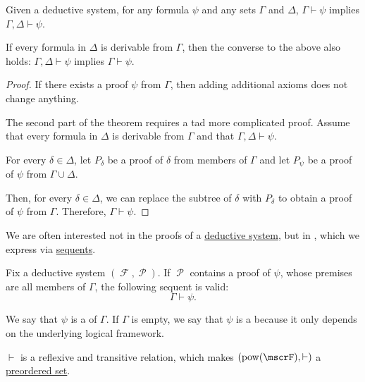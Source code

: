 \begin{proposition}\label{thm:deductive_system_transitivity}
  Given a deductive system, for any formula \( \psi \) and any sets \( \Gamma \) and \( \Delta \), \( \Gamma \vdash \psi \) implies \( \Gamma, \Delta \vdash \psi \).

  If every formula in \( \Delta \) is derivable from \( \Gamma \), then the converse to the above also holds: \( \Gamma, \Delta \vdash \psi \) implies \( \Gamma \vdash \psi \).
\end{proposition}
\begin{proof}
  If there exists a proof \( \psi \) from \( \Gamma \), then adding additional axioms does not change anything.

  The second part of the theorem requires a tad more complicated proof. Assume that every formula in \( \Delta \) is derivable from \( \Gamma \) and that \( \Gamma, \Delta \vdash \psi \).

  For every \( \delta \in \Delta \), let \( P_\delta \) be a proof of \( \delta \) from members of \( \Gamma \) and let \( P_\psi \) be a proof of \( \psi \) from \( \Gamma \cup \Delta \).

  Then, for every \( \delta \in \Delta \), we can replace the subtree of \( \delta \) with \( P_\delta \) to obtain a proof of \( \psi \) from \( \Gamma \). Therefore, \( \Gamma \vdash \psi \).
\end{proof}

\begin{definition}\label{def:proof_derivability}\mimprovised
  We are often interested not in the proofs of a \hyperref[def:deductive_system]{deductive system}, but in , which we express via \hyperref[con:judgment/sequent]{sequents}.

  Fix a deductive system \( (\mscrF, \mscrP) \). If \( \mscrP \) contains a proof of \( \psi \), whose premises are all members of \( \Gamma \), the following sequent is valid:
  \begin{equation*}
    \Gamma \vdash \psi.
  \end{equation*}

  We say that \( \psi \) is a  of \( \Gamma \). If \( \Gamma \) is empty, we say that \( \psi \) is a  because it only depends on the underlying logical framework.
\end{definition}
\begin{comments}
  \item \( \vdash \) is a reflexive and transitive relation, which makes \( (\pow(\mscrF), \vdash) \) a \hyperref[def:preordered_set]{preordered set}.
\end{comments}

